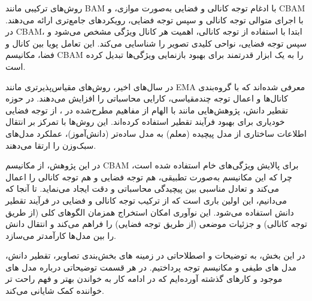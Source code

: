 روش‌های ترکیبی مانند BAM \cite{park2018bambottleneckattentionmodule} با ادغام توجه کانالی و فضایی به‌صورت موازی، و CBAM \cite{woo2018cbamconvolutionalblockattention} با اجرای متوالی توجه کانالی و سپس توجه فضایی، رویکردهای جامع‌تری ارائه می‌دهند. در CBAM، ابتدا با استفاده از توجه کانالی، اهمیت هر کانال ویژگی مشخص می‌شود و سپس توجه فضایی، نواحی کلیدی تصویر را شناسایی می‌کند. این تعامل پویا بین کانال و فضا، مکانیسم CBAM را به یک ابزار قدرتمند برای بهبود بازنمایی ویژگی‌ها تبدیل کرده است.

در سال‌های اخیر، روش‌های مقیاس‌پذیرتری مانند EMA \cite{Ouyang_2023} معرفی شده‌اند که با گروه‌بندی کانال‌ها و اعمال توجه چندمقیاسی، کارایی محاسباتی را افزایش می‌دهند. در حوزه تقطیر دانش، پژوهش‌هایی مانند \cite{9678134} با الهام از مفاهیم مطرح‌شده در \cite{8953974}، از توجه فضایی خودیاری برای بهبود فرآیند تقطیر استفاده کرده‌اند. این روش‌ها با تمرکز بر انتقال اطلاعات ساختاری از مدل پیچیده (معلم) به مدل ساده‌تر (دانش‌آموز)، عملکرد مدل‌های سبک‌وزن را ارتقا می‌دهند.

در این پژوهش، از مکانیسم CBAM برای پالایش ویژگی‌های خام استفاده شده است، چرا که این مکانیسم به‌صورت تطبیقی، هم توجه فضایی و هم توجه کانالی را اعمال می‌کند و تعادل مناسبی بین پیچیدگی محاسباتی و دقت ایجاد می‌نماید. تا آنجا که می‌دانیم، این اولین باری است که از ترکیب توجه کانالی و فضایی در فرآیند تقطیر دانش استفاده می‌شود. این نوآوری امکان استخراج همزمان الگوهای کلی (از طریق توجه کانالی) و جزئیات موضعی (از طریق توجه فضایی) را فراهم می‌کند و انتقال دانش را بین مدل‌ها کارآمدتر می‌سازد.


در این بخش، به توضیحات و اصطلاحاتی در زمینه های بخش‌بندی تصاویر، تقطیر دانش، مدل های طیفی و مکانیسم توجه پرداختیم. در هر قسمت توضیحاتی درباره مدل های موجود و کارهای گذشته آورده‌ایم که در ادامه کار به خواندن بهتر و فهم راحت تر خواننده کمک شایانی می‌کند.

\newpage